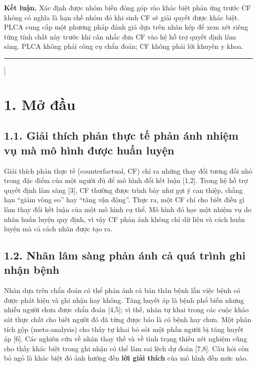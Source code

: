 \documentclass[9pt,a4paper]{extarticle}
\begin{document}
{\begin{minipage}[t]{0.715\textwidth}
{\textbf{Kết luận.} Xác định được nhóm biến đóng góp vào khác biệt phản ứng trước CF không có nghĩa là hạn chế nhóm đó khi sinh CF sẽ giải quyết được khác biệt. PLCA cung cấp một phương pháp đánh giá dựa trên nhãn kép để xem xét riêng từng tính chất này trước khi cân nhắc đưa CF vào hệ hỗ trợ quyết định lâm sàng. PLCA không phải công cụ chẩn đoán; CF không phải lời khuyên y khoa.\par}
\end{minipage}
\vspace{4pt}
{\color{rulegray}\rule{\textwidth}{0.4pt}}
\vspace{10pt}
}]
\begingroup\renewcommand\thefootnote{}\addtocounter{footnote}{-1}\endgroup
\section{1. Mở đầu}

\subsection{1.1. Giải thích phản thực tế phản ánh nhiệm vụ mà mô hình
được huấn luyện}

Giải thích phản thực tế (counterfactual, CF) chỉ ra những thay đổi tương
đối nhỏ trong đặc điểm của một người đủ để mô hình đổi kết luận
{[}1,2{]}. Trong hệ hỗ trợ quyết định lâm sàng {[}3{]}, CF thường được
trình bày như gợi ý can thiệp, chẳng hạn ``giảm vòng eo'' hay ``tăng vận
động''. Thực ra, một CF chỉ cho biết điều gì làm thay đổi kết luận của
một mô hình cụ thể. Mô hình đó học một nhiệm vụ do nhãn huấn luyện quy
định, vì vậy CF phản ánh không chỉ dữ liệu và cách huấn luyện mà cả cách
nhãn được tạo ra.

\subsection{1.2. Nhãn lâm sàng phản ánh cả quá trình ghi nhận bệnh}

Nhãn dựa trên chẩn đoán có thể phản ánh cả bản thân bệnh lẫn việc bệnh
có được phát hiện và ghi nhận hay không. Tăng huyết áp là bệnh phổ biến
nhưng nhiều người chưa được chẩn đoán {[}4,5{]}; vì thế, nhãn tự khai
trong các cuộc khảo sát thực chất cho biết người đó đã từng được báo là
có bệnh hay chưa. Một phân tích gộp (meta-analysis) cho thấy tự khai bỏ
sót một phần người bị tăng huyết áp {[}6{]}. Các nghiên cứu về nhãn thay
thế và về tình trạng thiếu xét nghiệm cũng cho thấy khác biệt trong ghi
nhận có thể làm sai lệch dự đoán {[}7,8{]}. Câu hỏi còn bỏ ngỏ là khác
biệt đó ảnh hưởng đến \textbf{lời giải thích} của mô hình đến mức nào.
\end{document}

